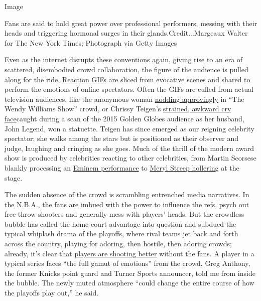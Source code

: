 Image

Fans are said to hold great power over professional performers, messing
with their heads and triggering hormonal surges in their
glands.Credit...Margeaux Walter for The New York Times; Photograph via
Getty Images

Even as the internet disrupts these conventions again, giving rise to an
era of scattered, disembodied crowd collaboration, the figure of the
audience is pulled along for the ride.
\href{https://www.vox.com/culture/2017/6/15/15804082/greatest-reaction-gifs-supa-hot-fire-blinking-white-guy}{Reaction
GIFs} are sliced from evocative scenes and shared to perform the
emotions of online spectators. Often the GIFs are culled from actual
television audiences, like the anonymous woman
\href{https://tenor.com/view/wendy-williams-gif-6115300}{nodding
approvingly} in ``The Wendy Williams Show'' crowd, or Chrissy Teigen's
\href{https://giphy.com/gifs/chrissy-nancy-odell-mEqMknMZWh1Fm}{strained,
awkward cry face}caught during a scan of the 2015 Golden Globes audience
as her husband, John Legend, won a statuette. Teigen has since emerged
as our reigning celebrity spectator; she walks among the stars but is
positioned as their observer and judge, laughing and cringing as she
goes. Much of the thrill of the modern award show is produced by
celebrities reacting to other celebrities, from Martin Scorsese blankly
processing an
\href{https://www.cinemablend.com/news/2489906/the-best-celebrity-reaction-shots-during-eminems-surprise-oscar-performance}{Eminem
performance} to
\href{https://www.popsugar.com/celebrity/Meryl-Streep-Shouting-2018-Oscars-44640382}{Meryl
Streep hollering} at the stage.

The sudden absence of the crowd is scrambling entrenched media
narratives. In the N.B.A., the fans are imbued with the power to
influence the refs, psych out free-throw shooters and generally mess
with players' heads. But the crowdless bubble has called the home-court
advantage into question and subdued the typical whiplash drama of the
playoffs, where rival teams jet back and forth across the country,
playing for adoring, then hostile, then adoring crowds; already, it's
clear that
\href{https://www.wsj.com/articles/nba-bubble-shooting-soccer-empty-stadiums-11596539693}{players
are shooting better} without the fans. A player in a typical series
faces ``the full gamut of emotions'' from the crowd, Greg Anthony, the
former Knicks point guard and Turner Sports announcer, told me from
inside the bubble. The newly muted atmosphere ``could change the entire
course of how the playoffs play out,'' he said.

